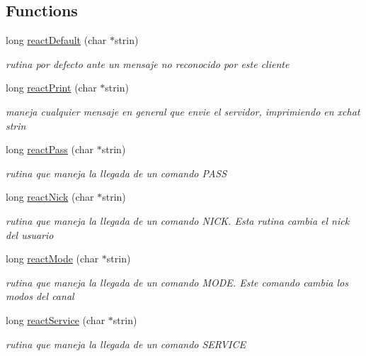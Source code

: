 \subsection*{Functions}
\begin{DoxyCompactItemize}
\item 
long \hyperlink{_g-2301-05-_p2-basic_commands_from_server_8h_a4a541fbbe2af9ced94c42bd9035763e0}{react\-Default} (char $\ast$strin)
\begin{DoxyCompactList}\small\item\em rutina por defecto ante un mensaje no reconocido por este cliente \end{DoxyCompactList}\item 
long \hyperlink{_g-2301-05-_p2-basic_commands_from_server_8h_a44650743c7ba1a6a2768d4156028e8d4}{react\-Print} (char $\ast$strin)
\begin{DoxyCompactList}\small\item\em maneja cualquier mensaje en general que envie el servidor, imprimiendo en xchat strin \end{DoxyCompactList}\item 
long \hyperlink{_g-2301-05-_p2-basic_commands_from_server_8h_ac8c9483ef017ea056ed519d084029cff}{react\-Pass} (char $\ast$strin)
\begin{DoxyCompactList}\small\item\em rutina que maneja la llegada de un comando P\-A\-S\-S \end{DoxyCompactList}\item 
long \hyperlink{_g-2301-05-_p2-basic_commands_from_server_8h_af4a1c3e0adb16c333386f048f948a174}{react\-Nick} (char $\ast$strin)
\begin{DoxyCompactList}\small\item\em rutina que maneja la llegada de un comando N\-I\-C\-K. Esta rutina cambia el nick del usuario \end{DoxyCompactList}\item 
long \hyperlink{_g-2301-05-_p2-basic_commands_from_server_8h_a4c0608743d68b02dc2edaa0e113293df}{react\-Mode} (char $\ast$strin)
\begin{DoxyCompactList}\small\item\em rutina que maneja la llegada de un comando M\-O\-D\-E. Este comando cambia los modos del canal \end{DoxyCompactList}\item 
long \hyperlink{_g-2301-05-_p2-basic_commands_from_server_8h_a6aac8ec73a892579e8988ee16cee507c}{react\-Service} (char $\ast$strin)
\begin{DoxyCompactList}\small\item\em rutina que maneja la llegada de un comando S\-E\-R\-V\-I\-C\-E \end{DoxyCompactList}\item 

\end{DoxyCompactItemize}
